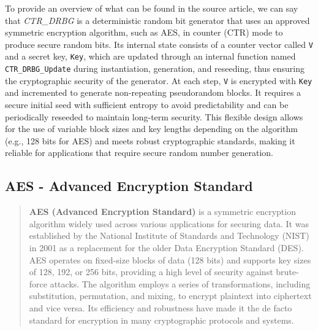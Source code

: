To provide an overview of what can be found in the source article, we can say that \textit{CTR\_DRBG} is a deterministic random bit generator that uses an approved symmetric encryption algorithm, such as AES, in counter (CTR) mode to produce secure random bits. Its internal state consists of a counter vector called \texttt{V} and a secret key, \texttt{Key}, which are updated through an internal function named \texttt{CTR\_DRBG\_Update} during instantiation, generation, and reseeding, thus ensuring the cryptographic security of the generator. At each step, \texttt{V} is encrypted with \texttt{Key} and incremented to generate non-repeating pseudorandom blocks. It requires a secure initial seed with sufficient entropy to avoid predictability and can be periodically reseeded to maintain long-term security. This flexible design allows for the use of variable block sizes and key lengths depending on the algorithm (e.g., 128 bits for AES) and meets robust cryptographic standards, making it reliable for applications that require secure random number generation.

\subsection{AES - Advanced Encryption Standard}
\label{sec:aes}
\begin{quote}
\textbf{AES (Advanced Encryption Standard)} is a symmetric encryption algorithm widely used across various applications for securing data. It was established by the National Institute of Standards and Technology (NIST) in 2001 as a replacement for the older Data Encryption Standard (DES). AES operates on fixed-size blocks of data (128 bits) and supports key sizes of 128, 192, or 256 bits, providing a high level of security against brute-force attacks. The algorithm employs a series of transformations, including substitution, permutation, and mixing, to encrypt plaintext into ciphertext and vice versa. Its efficiency and robustness have made it the de facto standard for encryption in many cryptographic protocols and systems.
\end{quote}
